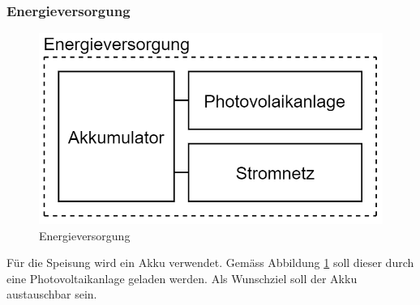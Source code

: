 \subsubsection{Energieversorgung}
\begin{figure}[h]
\centering
\includegraphics[scale=0.6]{graphics/Konzeptdiagramme/Energieversorgung.PNG}
\caption{Energieversorgung}
\label{fig:Energieversorgung}
\end{figure}

Für die Speisung wird ein Akku verwendet. Gemäss Abbildung \ref{fig:Energieversorgung} soll dieser durch eine Photovoltaikanlage geladen werden. Als Wunschziel soll der Akku austauschbar sein.\\